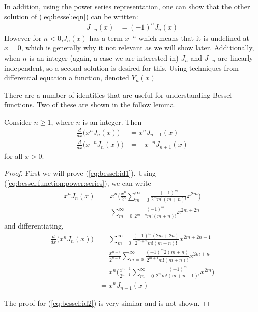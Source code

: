 In addition, using the power series representation, one can show that the other solution of (\ref{eq:bessel:eqn}) can be written:
\begin{align*}
J_{-n}(x) & = (-1)^n J_n(x)
\end{align*}
However for $n<0$,$J_n(x)$ has a term $x^{-n}$ which means that it is undefined at $x=0$, which is generally why it not relevant as we will show later.  Additionally, when $n$ is an integer (again, a case we are interested in) $J_n$ and $J_{-n}$ are linearly independent, so a second solution is desired for this.  Using techniques from differential equation a function, denoted $Y_n(x)$ 
  
There are a number of identities that are useful for understanding Bessel functions.  Two of these are shown in the follow lemma. 

\begin{lemma} \label{lem:bessel:identities}
Consider $n\geq 1$, where $n$ is an integer.  Then 
%
\begin{align}
\frac{d}{dx} \bigl( x^n J_n(x) \bigr) & = x^n J_{n-1} (x) \label{eq:bessel:id1}\\ 
\frac{d}{dx} \bigl( x^{-n} J_n(x) \bigr) & = -x^{-n} J_{n+1} (x)\label{eq:bessel:id2}
\end{align}
for all $x>0$.  
\end{lemma}
\begin{proof}
First we will prove (\ref{eq:bessel:id1}).  Using (\ref{eq:bessel:function:power:series}), we can write
%
\begin{align*}
x^nJ_n(x) & = x^n \biggl( \frac{x^{n}}{2^{n}} \sum_{m=0}^{\infty} \frac{(-1)^m}{2^m m! (m+n)!} x^{2m} \biggr) \\\
& = \sum_{m=0}^{\infty} \frac{(-1)^m}{2^{m+n} m! (m+n)!} x^{2m+2n} 
\end{align*}
and differentiating,
\begin{align*}
\frac{d}{dx} \bigl(x^nJ_n(x)\bigr) & =  \sum_{m=0}^{\infty} \frac{(-1)^m(2m+2n)}{2^{m+n} m! (m+n)!} x^{2m+2n-1} \\
& = \frac{x^{n-1}}{2^{n-1}}  \sum_{m=0}^{\infty} \frac{(-1)^m2(m+n)}{2^{m+1} m! (m+n)!} x^{2m+n} \\
& = x^n \biggl(\frac{x^{n-1}}{2^{n-1}}  \sum_{m=0}^{\infty} \frac{(-1)^m}{2^{m} m! (m+n-1)!} x^{2m}) \\
&  = x^{n} J_{n-1}(x)
\end{align*}

The proof for (\ref{eq:bessel:id2}) is very similar and is not shown. 
\end{proof}


